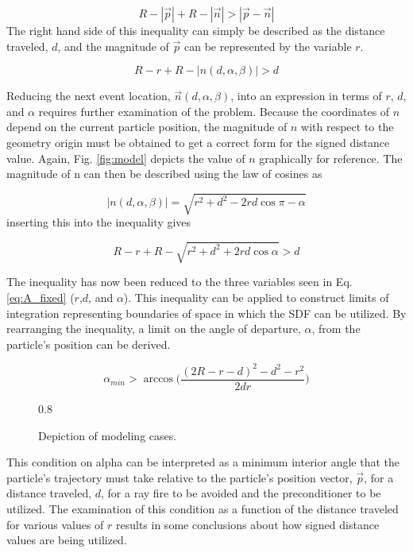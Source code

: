 \begin{equation}
R-|\vec{p}| + R - |\vec{n}| >   |\vec{p}-\vec{n}|
\end{equation}
The right hand side of this inequality can simply be described as the distance
traveled, $d$, and the magnitude of $\vec{p}$ can be represented
by the variable $r$.

\begin{equation}
 R-r + R - |n(d,\alpha,\beta)| > d
\end{equation}

Reducing the next event location, $\vec{n}(d,\alpha,\beta)$, into an expression
in terms of $r$, $d$, and $\alpha$ requires further examination of the
problem. Because the coordinates of $n$ depend on the current particle position,
the magnitude of $n$ with respect to the geometry origin must be obtained to get
a correct form for the signed distance value. Again, Fig. \ref{fig:model} depicts the
value of $n$ graphically for reference. The magnitude of n can then be described
using the law of cosines as

\begin{equation}
|n(d,\alpha,\beta)| = \sqrt{r^2 + d^2 - 2rd \cos{\pi-\alpha}}
\end{equation}
inserting this into the inequality gives

\begin{equation}
R-r + R - \sqrt{r^2 + d^2 + 2rd \cos{\alpha}} > d
\end{equation}

The inequality has now been reduced to the three variables seen in
Eq. \ref{eq:A_fixed} ($r$,$d$, and $\alpha$). This inequality can be applied to
construct limits of integration representing boundaries of space in which the
SDF can be utilized. By rearranging the inequality, a limit on the angle of
departure, $\alpha$, from the particle's position can be derived.

\begin{equation}
\alpha_{min} > \arccos\Bigg ( \frac{(2R-r-d)^2-d^2-r^2}{2 d r} \Bigg )
\end{equation}

\begin{figure}[ht]
  \centering
  {0.8\textwidth}
  \caption{Depiction of modeling cases.}
  \label{fig:modeling_cases}
\end{figure}

This condition on alpha can be interpreted as a minimum interior angle that the
particle's trajectory must take relative to the particle's position vector,
$\vec{p}$, for a distance traveled, $d$, for a ray fire to be avoided and the
preconditioner to be utilized. The examination of this condition as a function
of the distance traveled for various values of $r$ results in some conclusions
about how signed distance values are being utilized.

